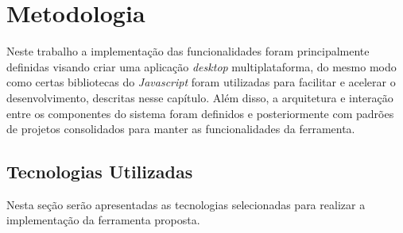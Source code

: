 \documentclass[
	12pt,				%
	openright,			%
	oneside,			%
	a4paper,			%
	english,			%
	brazil				%
	]{abntex2}
\begin{document}
\chapter{Metodologia}
\label{ch:metodologia}

Neste trabalho a implementação das funcionalidades foram principalmente definidas visando criar uma aplicação \textit{desktop} multiplataforma, do mesmo modo como certas bibliotecas do \textit{Javascript} foram utilizadas para facilitar e acelerar o desenvolvimento, descritas nesse capítulo.
Além disso, a arquitetura e interação entre os componentes do sistema foram definidos e posteriormente com padrões de projetos consolidados para manter as funcionalidades da ferramenta.

\section{Tecnologias Utilizadas}
Nesta seção serão apresentadas as tecnologias selecionadas para realizar a implementação da ferramenta proposta.
\end{document}
